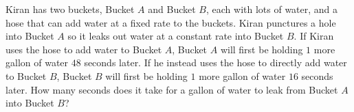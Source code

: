Kiran has two buckets, Bucket $A$ and Bucket $B$, each with lots of water, and a hose that can add water at a fixed rate to the buckets. Kiran punctures a hole into Bucket $A$ so it leaks out water at a constant rate into Bucket $B$. If Kiran uses the hose to add water to Bucket $A$, Bucket $A$ will first be holding $1$ more gallon of water $48$ seconds later. If he instead uses the hose to directly add water to Bucket $B$, Bucket $B$ will first be holding $1$ more gallon of water $16$ seconds later. How many seconds does it take for a gallon of water to leak from Bucket $A$ into Bucket $B$?
